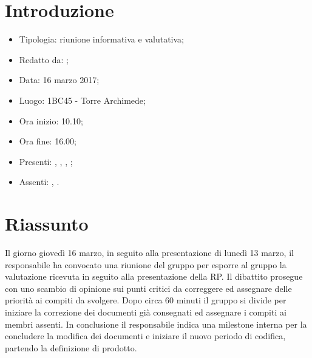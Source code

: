 \section{Introduzione}

	\begin{itemize}
		\item Tipologia: riunione informativa e valutativa;
		\item Redatto da: \NS;
		\item Data: 16 marzo 2017;
		\item Luogo: 1BC45 - Torre Archimede;
		\item Ora inizio: 10.10;
		\item Ora fine: 16.00;
		\item Presenti: \AS, \DS, \NS, \DAN;	
		\item Assenti: \MC, \AN.
	\end{itemize}

\section{Riassunto}
Il giorno giovedì 16 marzo, in seguito alla presentazione di lunedì 13 marzo, il responsabile ha convocato una riunione del gruppo per esporre al gruppo la valutazione ricevuta in seguito alla presentazione della RP. 
Il dibattito prosegue con uno scambio di opinione sui punti critici da correggere ed assegnare delle priorità ai compiti da svolgere. Dopo circa 60 minuti il gruppo si divide per iniziare la correzione dei documenti già consegnati ed assegnare i compiti ai membri assenti.
In conclusione il responsabile indica una milestone interna per la concludere la modifica dei documenti e iniziare il nuovo periodo di codifica, partendo la definizione di prodotto.